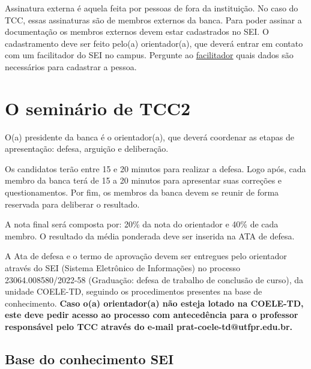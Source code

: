 \documentclass[a4paper, 12pt]{article}
\begin{document}
	Assinatura externa é aquela feita por pessoas de fora da instituição. No caso do TCC, essas assinaturas são de membros externos da banca. Para poder assinar a documentação os membros externos devem estar cadastrados no SEI. O cadastramento deve ser feito pelo(a) orientador(a), que deverá entrar em contato com um facilitador do SEI no campus. Pergunte ao \href{http://portal.utfpr.edu.br/servidores/servicos-servidor/sei/facilitadores}{facilitador} quais dados são necessários para cadastrar a pessoa.

	\section{O seminário de TCC2}
	
	O(a) presidente da banca é o orientador(a), que deverá coordenar as etapas de apresentação: defesa, arguição e deliberação. 
	
	Os candidatos terão entre 15 e 20 minutos para realizar a defesa. Logo após, cada membro da banca terá de 15 a 20 minutos para apresentar suas correções e questionamentos. Por fim, os membros da banca devem se reunir de forma reservada para deliberar o resultado.
	
	
	
	A nota final será composta por: 20\% da nota do orientador e 40\% de cada membro. O resultado da média ponderada deve ser inserida na ATA de defesa.
	
	A Ata de defesa e o termo de aprovação devem ser entregues pelo orientador através do SEI (Sistema Eletrônico de Informações) no processo 23064.008580/2022-58 (Graduação: defesa de trabalho de conclusão de curso), da unidade COELE-TD, seguindo os procedimentos presentes na base de conhecimento. \textbf{Caso o(a) orientador(a) não esteja lotado na COELE-TD, este deve pedir acesso ao processo com antecedência para o professor responsável pelo TCC através do e-mail prat-coele-td@utfpr.edu.br.}
	
	\subsection{Base do conhecimento SEI}
	
\end{document}
